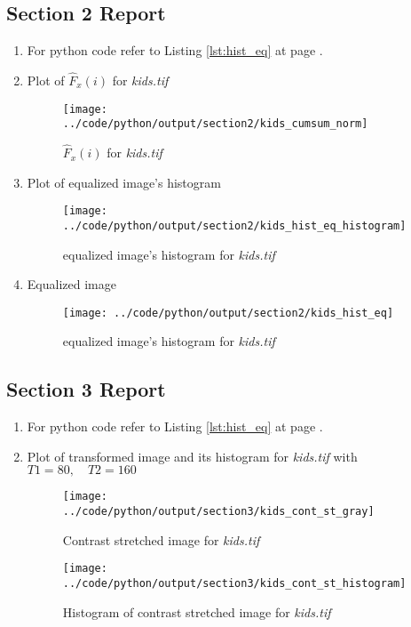 \documentclass[a4paper,11pt]{article}
\newcommand{\reflst}[1]{Listing \ref{#1} at page \pageref{#1}}
\begin{document}
\subsection*{Section 2 Report} 
\begin{enumerate}
\item For python code refer to \reflst{lst:hist_eq}.
 
\item Plot of $\hat{F}_x(i)$ for \textit{kids.tif}
\begin{figure}[!hp]
 \centering
 \texttt{[image: ../code/python/output/section2/kids\_cumsum\_norm]}
 \caption{$\hat{F}_x(i)$ for \textit{kids.tif}}
\end{figure}

\clearpage
\item Plot of equalized image's histogram
\begin{figure}[!hp]
 \centering
 \texttt{[image: ../code/python/output/section2/kids\_hist\_eq\_histogram]}
 \caption{equalized image's histogram for \textit{kids.tif}}
\end{figure}

\clearpage
\item Equalized image
\begin{figure}[!hp]
 \centering
 \texttt{[image: ../code/python/output/section2/kids\_hist\_eq]}
 \caption{equalized image's histogram for \textit{kids.tif}}
\end{figure}

\end{enumerate}

%
\clearpage
\vspace{2ex}
%
\subsection*{Section 3 Report} 
\begin{enumerate}
\item For python code refer to \reflst{lst:hist_eq}.
 
\item Plot of transformed image and its histogram for \textit{kids.tif} with $T1=80,\quad T2=160$
\begin{figure}[!hp]
 \centering
 \texttt{[image: ../code/python/output/section3/kids\_cont\_st\_gray]}
 \caption{Contrast stretched image for \textit{kids.tif}}
\end{figure}
\begin{figure}[!hp]
 \centering
 \texttt{[image: ../code/python/output/section3/kids\_cont\_st\_histogram]}
 \caption{Histogram of contrast stretched image for \textit{kids.tif}}
\end{figure}
\end{enumerate}
\end{document}

